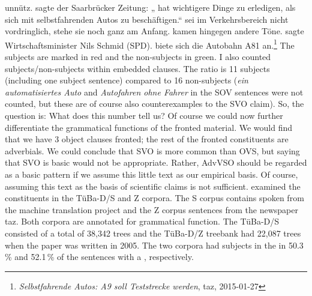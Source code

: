 unnütz.  sagte der Saarbrücker Zeitung: „ hat wichtigere Dinge zu erledigen, als sich mit selbstfahrenden Autos zu beschäftigen.“
 sei im Verkehrsbereich nicht vordringlich,  stehe sie noch ganz am
Anfang.  
kamen hingegen andere Töne.  sagte Wirtschaftsminister Nils Schmid (SPD).  biete sich die Autobahn A81 an.\footnote{\emph{Selbstfahrende Autos: A9 soll Teststrecke werden}, taz, 2015-01-27}
\z
\largerpage
The subjects are marked in red and the non-subjects in green. I also counted subjects/non-subjects
within embedded clauses. The ratio is 11 subjects (including one subject sentence) compared to 16
non-subjects (\emph{ein automatisiertes Auto} and \emph{Autofahren ohne Fahrer} in the SOV sentences were not counted, but these are
of course also counterexamples to the SVO claim). So, the question is: What does
this number tell us? Of course we could now further differentiate the grammatical functions of the
fronted material. We would find that we have 3 object clauses fronted; the rest of the fronted
constituents are adverbials. We could conclude that SVO is more common than OVS, but saying that SVO
is basic would not be appropriate. Rather, AdvVSO should be regarded as a basic pattern if we
assume this little text as our empirical basis. Of course, assuming this text as the basis of
scientific claims is not sufficient. 
\largerpage 
\citet[Section~4]{HK2005a} examined the \vf
constituents in the TüBa-D/S and Z corpora. The S corpus contains spoken  from the machine
translation project \verbmobil and the Z corpus sentences from the  newspaper taz. Both
corpora are annotated for grammatical function. The TüBa-D/S consisted of a total of 38,342 trees
and the TüBa-D/Z treebank had 22,087 trees when the paper was written in 2005. The two corpora had
subjects in the \vf in 50.3\,\% and 52.1\,\% of the sentences with a \vf, respectively. 
